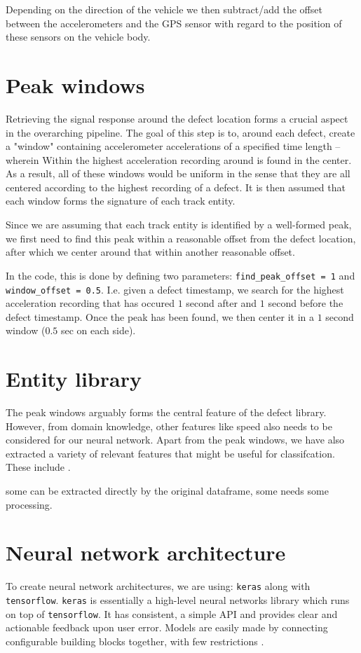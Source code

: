 Depending on the direction of the vehicle we then subtract/add the offset between the accelerometers and the GPS sensor with regard to the position of these sensors on the vehicle body.


\section{Peak windows}
Retrieving the signal response around the defect location forms a crucial aspect in the overarching pipeline. The goal of this step is to, around each defect, create a "window" containing accelerometer accelerations of a specified time length -- wherein Within the highest acceleration recording around is found in the center. As a result, all of these windows would be uniform in the sense that they are all centered according to the highest recording of a defect. It is then assumed that each window forms the signature of each track entity. 

Since we are assuming that each track entity is identified by a well-formed peak, we first need to find this peak within a reasonable offset from the defect location, after which we center around that within another reasonable offset. 

In the code, this is done by defining two parameters: \verb|find_peak_offset = 1| and \verb|window_offset = 0.5|. I.e. given a defect timestamp, we search for the highest acceleration recording that has occured $1$ second after and $1$ second before the defect timestamp. Once the peak has been found, we then center it in a $1$ second window ($0.5$ sec on each side).


\section{Entity library}
The peak windows arguably forms the central feature of the defect library. However, from domain knowledge, other features like speed also needs to be considered for our neural network. Apart from the peak windows, we have also extracted a variety of relevant features that might be useful for classifcation. These include .

some can be extracted directly by the original dataframe, some needs some processing.

\section{Neural network architecture}
To create neural network architectures, we are using: \verb|keras| along with \verb|tensorflow|. \verb|keras| is essentially a high-level neural networks library which runs on top of \verb|tensorflow|. It has consistent, a simple API and provides clear and actionable feedback upon user error. Models are easily made by connecting configurable building blocks together, with few restrictions \cite{TensorFl31:online}.

